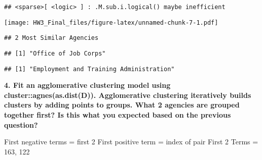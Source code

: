 \documentclass[]{article}
\newenvironment{Shaded}{\begin{snugshade}}{\end{snugshade}}
\newcommand{\CommentTok}[1]{\textcolor[rgb]{0.56,0.35,0.01}{\textit{#1}}}
\newcommand{\DecValTok}[1]{\textcolor[rgb]{0.00,0.00,0.81}{#1}}
\newcommand{\KeywordTok}[1]{\textcolor[rgb]{0.13,0.29,0.53}{\textbf{#1}}}
\newcommand{\NormalTok}[1]{#1}
\newcommand{\OperatorTok}[1]{\textcolor[rgb]{0.81,0.36,0.00}{\textbf{#1}}}
\newcommand{\StringTok}[1]{\textcolor[rgb]{0.31,0.60,0.02}{#1}}
\begin{document}
\begin{verbatim}
## <sparse>[ <logic> ] : .M.sub.i.logical() maybe inefficient
\end{verbatim}

\texttt{[image: HW3\_Final\_files/figure-latex/unnamed-chunk-7-1.pdf]}

\begin{Shaded}
\end{Shaded}

\begin{verbatim}
## 2 Most Similar Agencies
\end{verbatim}

\begin{Shaded}
\end{Shaded}

\begin{verbatim}
## [1] "Office of Job Corps"
\end{verbatim}

\begin{Shaded}
\end{Shaded}

\begin{verbatim}
## [1] "Employment and Training Administration"
\end{verbatim}

\textbf{4. Fit an agglomerative clustering model using
cluster::agnes(as.dist(D)). Agglomerative clustering iteratively builds
clusters by adding points to groups. What 2 agencies are grouped
together first? Is this what you expected based on the previous
question?}

First negative terms = first 2 First positive term = index of pair First
2 Terms = 163, 122
\end{document}
